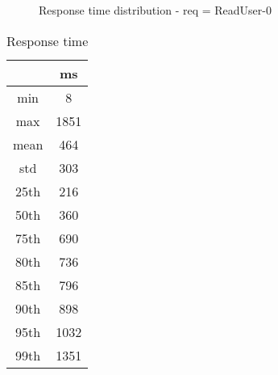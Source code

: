 \begin{minipage}{0.75\linewidth}
\begin{figure}[h]
\begin{adjustbox}{max width=1.0\linewidth, keepaspectratio}
  \end{adjustbox}
  \caption{Response time distribution - req = ReadUser-0}
\end{figure}
\end{minipage}\hfill\begin{minipage}{0.18\linewidth}
\begin{table}[h]
\begin{tabular}{|cc|}
\hline
\textbf{} & \textbf{ms}\\ \hline
 \Xhline{0.005\arrayrulewidth}
min & 8\\
 \Xhline{0.005\arrayrulewidth}
max & 1851\\
 \Xhline{0.005\arrayrulewidth}
mean & 464\\
 \Xhline{0.005\arrayrulewidth}
std & 303\\
\hline
\hline
 \Xhline{0.005\arrayrulewidth}
25th & 216\\
 \Xhline{0.005\arrayrulewidth}
50th & 360\\
 \Xhline{0.005\arrayrulewidth}
75th & 690\\
 \Xhline{0.005\arrayrulewidth}
80th & 736\\
 \Xhline{0.005\arrayrulewidth}
85th & 796\\
 \Xhline{0.005\arrayrulewidth}
90th & 898\\
 \Xhline{0.005\arrayrulewidth}
95th & 1032\\
 \Xhline{0.005\arrayrulewidth}
99th & 1351\\
\hline
\end{tabular}
\caption{Response time}
\end{table}
\end{minipage}\hfill